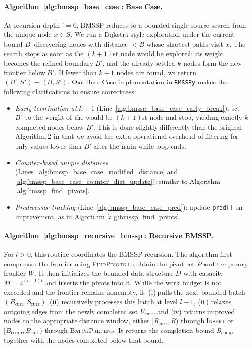 \documentclass[ijoc,blindrev]{informs3} %
\begin{document}
\paragraph{Algorithm~\ref{alg:bmssp_base_case}: Base Case.}
At recursion depth $l=0$, BMSSP reduces to a bounded single-source search from the unique {\color{blue}node} $x\in S$. We run a Dijkstra-style exploration under the current bound $B$, discovering nodes with distance $<B$ whose shortest paths visit $x$. The search stops as soon as the $(k+1)$st node would be explored; its weight becomes the refined boundary $B'$, and the already-settled $k$ nodes form the new frontier below $B'$. If fewer than $k+1$ nodes are found, we return $(B',S')=(B,S')$. Our Base Case implementation in \texttt{BMSSPy} makes the following clarifications to ensure correctness:
\begin{itemize}
  \item \textit{Early termination at $k{+}1$} (Line~\ref{alg:bmssp_base_case_early_break}): set $B'$ to the weight of the would-be $(k{+}1)$st node and stop, yielding exactly $k$ completed nodes below $B'$. This is done slightly differently than the original \citet{duan_breaking_2025} Algorithm 2 in that we avoid the extra operational overhead of filtering for only values lower than $B'$ after the main while loop ends.
  \item \textit{Counter-based unique distances} (Lines~\ref{alg:bmssp_base_case_modified_distance} and \ref{alg:bmssp_base_case_counter_dist_update}): similar to Algorithm \ref{alg:bmssp_find_pivots}.
  \item \textit{Predecessor tracking} (Line~\ref{alg:bmssp_base_case_pred}): update \texttt{pred[]} on improvement, as in Algorithm \ref{alg:bmssp_find_pivots}.
\end{itemize}



\paragraph{Algorithm~\ref{alg:bmssp_recursive_bmssp}: Recursive BMSSP.}
For $l>0$, this routine coordinates the BMSSP recursion. The algorithm first compresses the frontier using \textsc{FindPivots} to obtain the pivot set $P$ and temporary frontier $W$. It then initializes the bounded data structure $D$ with capacity $M=2^{(l-1)t}$ and inserts the pivots into it. While the work budget is not exceeded and the frontier remains nonempty, it:
(i) pulls the next bounded batch $(B_{\mathrm{curr}},S_{\mathrm{curr}})$,
(ii) recursively processes this batch at level $l-1$,
(iii) relaxes outgoing edges from the newly completed set $U_{\mathrm{curr}}$, and
(iv) returns improved nodes to the appropriate distance window, either $[B_{\mathrm{curr}},B)$ through \textsc{Insert} or $[B_{\mathrm{comp}},B_{\mathrm{curr}})$ through \textsc{BatchPrepend}.
It returns the completion bound $B_{\mathrm{comp}}$ together with the nodes completed below that bound.
\end{document}

